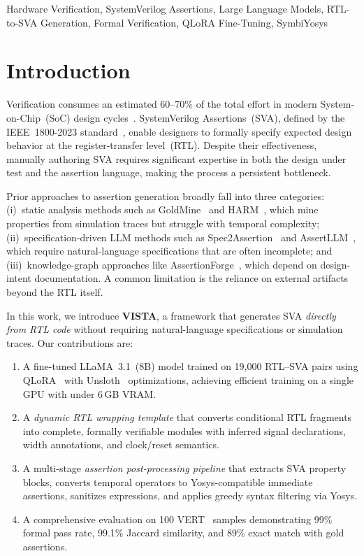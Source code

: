 \documentclass[conference]{IEEEtran}
\begin{document}
\begin{IEEEkeywords}
Hardware Verification, SystemVerilog Assertions, Large Language Models, RTL-to-SVA Generation, Formal Verification, QLoRA Fine-Tuning, SymbiYosys
\end{IEEEkeywords}

\section{Introduction}
\label{sec:intro}

Verification consumes an estimated 60--70\% of the total effort in modern System-on-Chip~(SoC) design cycles~\cite{foster2015trends}. SystemVerilog Assertions~(SVA), defined by the IEEE~1800-2023 standard~\cite{ieee1800}, enable designers to formally specify expected design behavior at the register-transfer level~(RTL). Despite their effectiveness, manually authoring SVA requires significant expertise in both the design under test and the assertion language, making the process a persistent bottleneck.

Prior approaches to assertion generation broadly fall into three categories: (i)~static analysis methods such as GoldMine~\cite{goldmine} and HARM~\cite{harm}, which mine properties from simulation traces but struggle with temporal complexity; (ii)~specification-driven LLM methods such as Spec2Assertion~\cite{spec2assertion} and AssertLLM~\cite{assertllm}, which require natural-language specifications that are often incomplete; and (iii)~knowledge-graph approaches like AssertionForge~\cite{assertionforge}, which depend on design-intent documentation. A common limitation is the reliance on external artifacts beyond the RTL itself.

In this work, we introduce \textbf{VISTA}, a framework that generates SVA \emph{directly from RTL code} without requiring natural-language specifications or simulation traces. Our contributions are:

\begin{enumerate}
    \item A fine-tuned LLaMA~3.1~(8B) model trained on 19{,}000 RTL--SVA pairs using QLoRA~\cite{qlora} with Unsloth~\cite{unsloth} optimizations, achieving efficient training on a single GPU with under 6\,GB VRAM.
    \item A \emph{dynamic RTL wrapping template} that converts conditional RTL fragments into complete, formally verifiable modules with inferred signal declarations, width annotations, and clock/reset semantics.
    \item A multi-stage \emph{assertion post-processing pipeline} that extracts SVA property blocks, converts temporal operators to Yosys-compatible immediate assertions, sanitizes expressions, and applies greedy syntax filtering via Yosys.
    \item A comprehensive evaluation on 100 VERT~\cite{vert} samples demonstrating 99\% formal pass rate, 99.1\% Jaccard similarity, and 89\% exact match with gold assertions.
\end{enumerate}
\end{document}
